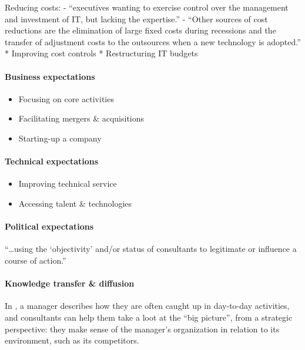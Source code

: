 \documentclass[12pt]{article}
\providecommand{\tightlist}{%
  \setlength{\itemsep}{0pt}\setlength{\parskip}{0pt}}
\begin{document}
Reducing costs: - ``executives wanting to exercise control over the
management and investment of IT, but lacking the expertise.'' \citep[
233]{sturdy1998} - ``Other sources of cost reductions are the
elimination of large fixed costs during recessions and the transfer of
adjustment costs to the outsources when a new technology is adopted.''
\citep{aubert1996} * Improving cost controls * Restructuring IT budgets

\hypertarget{business-expectations}{%
\paragraph{Business expectations}\label{business-expectations}}

\begin{itemize}
\tightlist
\item
  Focusing on core activities
\item
  Facilitating mergers \& acquisitions
\item
  Starting-up a company
\end{itemize}

\hypertarget{technical-expectations}{%
\paragraph{Technical expectations}\label{technical-expectations}}

\begin{itemize}
\tightlist
\item
  Improving technical service
\item
  Accessing talent \& technologies
\end{itemize}

\hypertarget{political-expectations}{%
\paragraph{Political expectations}\label{political-expectations}}

``\ldots using the `objectivity' and/or status of consultants to
legitimate or influence a course of action.'' \citep[ 233]{sturdy1998}

\hypertarget{knowledge-transfer-diffusion}{%
\paragraph{Knowledge transfer \&
diffusion}\label{knowledge-transfer-diffusion}}

In \citet[53]{werr2002}, a manager describes how they are often caught
up in day-to-day activities, and consultants can help them take a loot
at the ``big picture'', from a strategic perspective: they make sense of
the manager's organization in relation to its environment, such as its
competitors.
\end{document}
